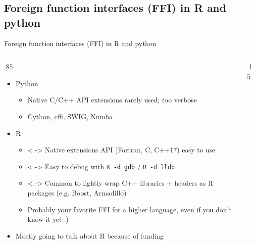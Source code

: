 \documentclass[
aspectratio=169,
xcolor={usenames}
]{beamer}
\begin{document}
\subsection{Foreign function interfaces (FFI) in R and python}
\begin{frame}{Foreign function interfaces (FFI) in R and python}
  \begin{columns}[T]
    \begin{column}{.85\framewidth}
      \begin{itemize}[<+->]
      \item Python
        \begin{itemize}[<.->]
        \item Native C/C++ API extensions rarely used; too verbose
        \item Cython, cffi, SWIG, Numba
        \end{itemize}
      \item R
        \begin{itemize}
        \item<.-> Native extensions API (Fortran, C, C++17) easy to use%
          \footnotemark[1]
        \item<.-> Easy to debug with \texttt{R -d gdb} / \texttt{R -d lldb}
        \item<.-> Common to lightly wrap C++ libraries + headers as R packages %
          (e.g. Boost, Armadillo)
        \item Probably your favorite FFI for a higher language, %
          even if you don't know it yet :)
        \end{itemize}
      \item Mostly going to talk about R because of funding
      \end{itemize}
    \end{column}
    \begin{column}{.15\framewidth}
\end{column}
\end{columns}
\end{frame}
\end{document}

